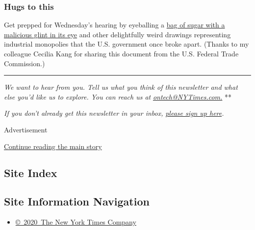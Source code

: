 \hypertarget{hugs-to-this}{%
\subsubsection{Hugs to this}\label{hugs-to-this}}

Get prepped for Wednesday's hearing by eyeballing a
\href{https://www.consumer.ftc.gov/sites/default/files/games/off-site/youarehere/pages/pdf/FTC-Competition_Antitrust-Laws.pdf}{bag
of sugar with a malicious glint in its eye} and other delightfully weird
drawings representing industrial monopolies that the U.S. government
once broke apart. (Thanks to my colleague Cecilia Kang for sharing this
document from the U.S. Federal Trade Commission.)

\begin{center}\rule{0.5\linewidth}{\linethickness}\end{center}

\emph{We want to hear from you. Tell us what you think of this
newsletter and what else you'd like us to explore. You can reach us at}
\href{mailto:ontech@NYTimes.com?subject=On\%20Tech\%20Feedback}{\emph{ontech@NYTimes.com.}}
**

\emph{If you don't already get this newsletter in your inbox,}
\href{https://www.nytimes3xbfgragh.onion/newsletters/signup/OT}{\emph{please
sign up here}}\emph{.}

Advertisement

\protect\hyperlink{after-bottom}{Continue reading the main story}

\hypertarget{site-index}{%
\subsection{Site Index}\label{site-index}}

\hypertarget{site-information-navigation}{%
\subsection{Site Information
Navigation}\label{site-information-navigation}}

\begin{itemize}
\tightlist
\item
  \href{https://help.nytimes3xbfgragh.onion/hc/en-us/articles/115014792127-Copyright-notice}{©~2020~The
  New York Times Company}
\end{itemize}

